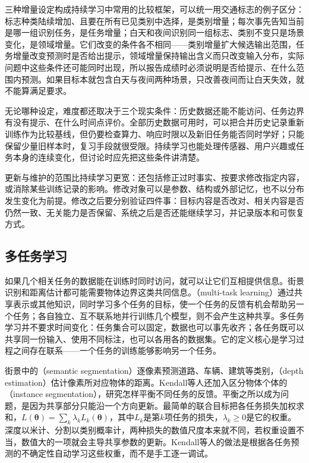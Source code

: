 三种增量设定构成持续学习中常用的比较框架，可以统一用交通标志的例子区分：标志种类陆续增加、且要在所有已见类别中选择，是类别增量；每次事先告知当前是哪一组识别任务，是任务增量；白天和夜间识别同一组标志、类别不变只是场景变化，是领域增量。它们改变的条件各不相同——类别增量扩大候选输出范围，任务增量改变预测时是否给出提示，领域增量保持输出含义而只改变输入分布，实际问题中这些条件还可能同时出现，所以报告成绩时必须说明是否给提示、在什么范围内预测。如果目标本就包含白天与夜间两种场景，只改善夜间而让白天失效，就不能算满足要求。

无论哪种设定，难度都还取决于三个现实条件：历史数据还能不能访问、任务边界有没有提示、在什么时间点评价。全部历史数据可用时，可以把合并历史记录重新训练作为比较基线，但仍要检查算力、响应时限以及新旧任务能否同时学好；只能保留少量旧样本时，复习手段就很受限。持续学习也能处理传感器、用户兴趣或任务本身的连续变化，但讨论时应先把这些条件讲清楚。

更新与维护的范围比持续学习更宽：还包括修正过时事实、按要求修改指定内容，或消除某些训练记录的影响。修改对象可以是参数、结构或外部记忆，也不以分布发生变化为前提。修改之后要分别验证四件事：目标内容是否改对、相关内容是否仍然一致、无关能力是否保留、系统之后是否还能继续学习，并记录版本和可恢复方式。

\subsection{多任务学习}
\label{sec:multi-task-learning}

如果几个相关任务的数据能在训练时同时访问，就可以让它们互相提供信息。街景识别和距离估计都可能需要物体边界这类共同信息。（multi-task learning）通过共享表示或其他知识，同时学习多个任务的目标，使一个任务的反馈有机会帮助另一个任务；各自独立、互不联系地并行训练几个模型，则不会产生这种共享。多任务学习并不要求时间变化：任务集合可以固定，数据也可以事先收齐；各任务既可以共享同一份输入、使用不同标注，也可以各用各的数据集。它的定义核心是学习过程之间存在联系——一个任务的训练能够影响另一个任务。

街景中的（semantic segmentation）逐像素预测道路、车辆、建筑等类别，（depth estimation）估计像素所对应物体的距离。Kendall等人还加入区分物体个体的（instance segmentation），研究怎样平衡不同任务的反馈。平衡之所以成为问题，是因为共享部分只能沿一个方向更新。最简单的联合目标把各任务损失加权求和，$L(\bm{\theta})=\sum_{k}\lambda_kL_k(\bm{\theta})$，其中$L_k$是第$k$项任务的损失，$\lambda_k\geq 0$是它的权重。深度以米计、分割以类别概率计，两种损失的数值尺度本来就不同，若权重设置不当，数值大的一项就会主导共享参数的更新。Kendall等人的做法是根据各任务预测的不确定性自动学习这些权重，而不是手工逐一调试。

